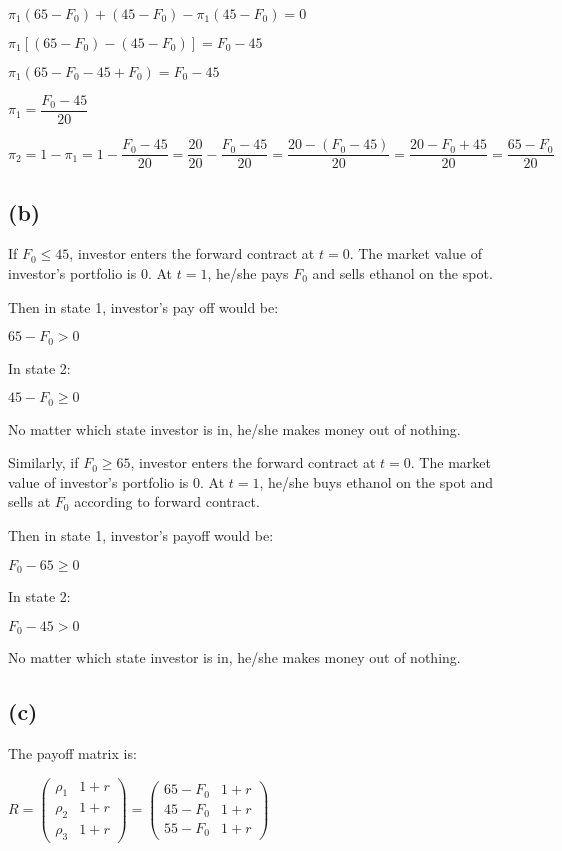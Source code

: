 \documentclass{article}
\begin{document}
$\pi_{1}\left(65-F_{0}\right)+\left(45-F_{0}\right)-\pi_{1}\left(45-F_{0}\right)=0$

$\pi_{1}\left[\left(65-F_{0}\right)-\left(45-F_{0}\right)\right]=F_{0}-45$

$\pi_{1}\left(65-F_{0}-45+F_{0}\right)=F_{0}-45$

$\pi_{1}=\boxed{\dfrac{F_{0}-45}{20}}$

$\pi_{2}=1-\pi_{1}=1-\dfrac{F_{0}-45}{20}=\dfrac{20}{20}-\dfrac{F_{0}-45}{20}=\dfrac{20-\left(F_{0}-45\right)}{20}=\dfrac{20-F_{0}+45}{20}=\boxed{\dfrac{65-F_{0}}{20}}$

\subsection*{(b)}

If $F_{0}\leqslant45$, investor enters the forward contract at $t=0$. The market value of investor's portfolio is 0. At $t=1$, he/she pays $F_{0}$ and sells ethanol on the spot.

Then in state 1, investor's pay off would be:

$65-F_{0}>0$

In state 2:

$45-F_{0}\geqslant0$

No matter which state investor is in, he/she makes money out of nothing. 

Similarly, if $F_{0}\geqslant65$, investor enters the forward contract at $t=0$. The market value of investor's portfolio is 0. At $t=1$, he/she buys ethanol on the spot and sells at $F_{0}$ according to forward contract.

Then in state 1, investor's payoff would be:

$F_{0}-65\geqslant0$

In state 2:

$F_{0}-45>0$

No matter which state investor is in, he/she makes money out of nothing. 

\subsection*{(c)}

The payoff matrix is:

$R=\begin{pmatrix}
    \rho_{1} & 1+r \\
    \rho_{2} & 1+r \\
    \rho_{3} & 1+r
\end{pmatrix}=\begin{pmatrix}
    65-F_{0} & 1+r \\
    45-F_{0} & 1+r \\
    55-F_{0} & 1+r
\end{pmatrix}$
\end{document}
